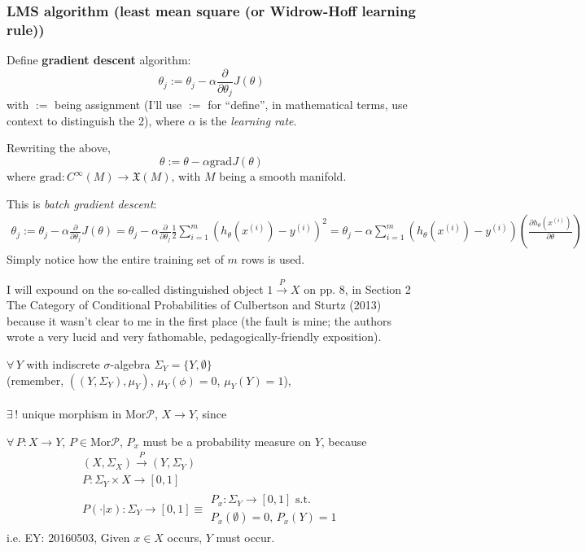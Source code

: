 \documentclass[10pt]{amsart}
\begin{document}
\begin{multicols*}{2}
\subsubsection{LMS algorithm (least mean square (or Widrow-Hoff learning rule))}

Define \textbf{gradient descent} algorithm:
\[
\theta_j := \theta_j- \alpha \frac{ \partial }{ \partial \theta_j} J(\theta)
\]
with $:=$ being assignment (I'll use $:=$ for ``define'', in mathematical terms, use context to distinguish the 2), where $\alpha$ is the \emph{learning rate}.  

Rewriting the above,
\[
\theta := \theta - \alpha \text{grad}J(\theta)
\]
where $\text{grad} : C^{\infty}(M) \to \mathfrak{X}(M)$, with $M$ being a smooth manifold.  

This is \emph{batch gradient descent}:
\[
\begin{gathered}
  \theta_j := \theta_j -\alpha \frac{ \partial }{ \partial \theta_j} J(\theta) = \theta_j - \alpha \frac{ \partial }{ \partial \theta_j} \frac{1}{2} \sum_{i=1}^m ( h_{\theta}(x^{(i)}) - y^{(i)})^2  = \theta_j - \alpha \sum_{i=1}^m (h_{\theta}(x^{(i)}) - y^{(i)} ) \left( \frac{ \partial h_{\theta}(x^{(i)}) }{\partial \theta} \right)
\end{gathered}
\]
Simply notice how the entire training set of $m$ rows is used.  

I will expound on the so-called distinguished object $1\xrightarrow{P}X$ on pp. 8, in Section 2 The Category of Conditional Probabilities of Culbertson and Sturtz (2013) \cite{CS2013} because it wasn't clear to me in the first place (the fault is mine; the authors wrote a very lucid and very fathomable, pedagogically-friendly exposition).  

$\forall \, Y $ with indiscrete $\sigma$-algebra $\Sigma_Y = \lbrace Y ,\emptyset \rbrace$ \\
\phantom{ \qquad \, } (remember, $((Y,\Sigma_Y), \mu_Y)$, $\mu_Y(\phi) = 0$, $\mu_Y(Y)=1$), \\
\qquad \\ 
$\exists \, !$ unique morphism in $\text{Mor}\mathcal{P}$, $X\to Y$, since 

$\forall \, P:X\to Y$, $P \in \text{Mor}\mathcal{P}$, $P_x$ must be a probability measure on $Y$, because 
\[
\begin{gathered}
  (X,\Sigma_X) \xrightarrow{ P } (Y,\Sigma_Y) \\ 
  P:\Sigma_Y\times X \to [0,1] \\ 
  P(\cdot | x):\Sigma_Y \to [0,1] \equiv \begin{gathered} P_x:\Sigma_Y \to [0,1]  \text{ s.t. }  \\ P_x(\emptyset) =0, \, P_x(Y) =1 \end{gathered}
\end{gathered}
\]
i.e. EY: 20160503, Given $x\in X$ occurs, $Y$ must occur. 


\end{multicols*}
\end{document}
